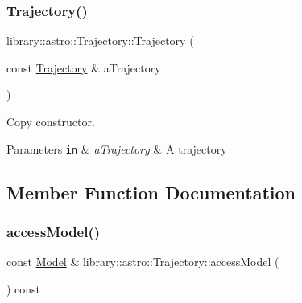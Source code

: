 \subsubsection{\texorpdfstring{Trajectory()}{Trajectory()}\hspace{0.1cm}{\footnotesize\ttfamily [3/3]}}
{\footnotesize\ttfamily library\+::astro\+::\+Trajectory\+::\+Trajectory (\begin{DoxyParamCaption}\item[{const \hyperlink{classlibrary_1_1astro_1_1_trajectory}{Trajectory} \&}]{a\+Trajectory }\end{DoxyParamCaption})}



Copy constructor. 


\begin{DoxyParams}[1]{Parameters}
\mbox{\tt in}  & {\em a\+Trajectory} & A trajectory \\
\hline
\end{DoxyParams}


\subsection{Member Function Documentation}
\mbox{\label{classlibrary_1_1astro_1_1_trajectory_ac5ebd6f282b52bb3d7c74a79375025e1}} 
\subsubsection{\texorpdfstring{access\+Model()}{accessModel()}}
{\footnotesize\ttfamily const \hyperlink{classlibrary_1_1astro_1_1trajectory_1_1_model}{Model} \& library\+::astro\+::\+Trajectory\+::access\+Model (\begin{DoxyParamCaption}{ }\end{DoxyParamCaption}) const\hspace{0.3cm}{\ttfamily [protected]}}

\mbox{\label{classlibrary_1_1astro_1_1_trajectory_a5b27c8ad8d547a00ad32c4ab1d63984f}} 
